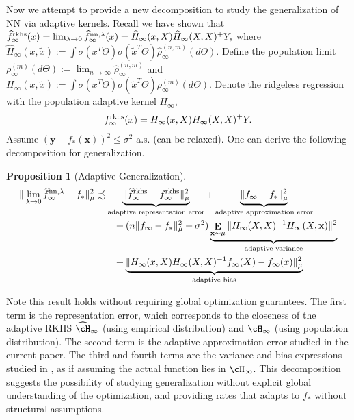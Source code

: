 \documentclass[11pt]{article}
\numberwithin{equation}{section}
\newtheorem{proposition}{Proposition}[section]
\def\E{\mathop{\mathbf{E}}}
\def\bd#1{\mathbf{#1}}
\def\bx{\bd{x}}
\def\by{\bd{y}}
\begin{document}
Now we attempt to provide a new decomposition to study the generalization of NN via adaptive kernels. Recall we have shown that
$\widehat{f}^{\rm rkhs}_{\infty}(x) = \lim_{\lambda \rightarrow 0} \widehat{f}^{{\rm nn}, \lambda}_{\infty} (x) = \widehat{H}_{\infty}(x, X) \widehat{H}_{\infty}(X, X)^{+} Y,$
where
$\widehat{H}_{\infty}(x, \tilde{x}) :=   \int \sigma(x^T \Theta) \sigma(\tilde{x}^T \Theta) \widehat{\rho}^{(n, m)}_\infty(d\Theta).$
Define the population limit
$\rho^{(m)}_{\infty}(d\Theta) := \lim_{n\rightarrow \infty } \widehat{\rho}^{(n, m)}_\infty $ and  $H_{\infty}(x, \tilde{x}) := \int \sigma(x^T \Theta) \sigma(\tilde{x}^T \Theta) \rho^{(m)}_\infty (d\Theta)$. Denote the ridgeless regression with the population adaptive kernel $H_\infty$,
\begin{align*}
    f^{\rm rkhs}_{\infty}(x) = H_{\infty}(x, X) H_{\infty}(X, X)^{+} Y.
\end{align*}
Assume $(\by - f_*(\bx))^2 \leq \sigma^2$ a.s. (can be relaxed). One can derive the following decomposition for generalization.
\begin{proposition}[Adaptive Generalization]
    \label{prop:adaptive-generalization}
    \begin{align*}
        \| \lim_{\lambda \rightarrow 0} \widehat{f}^{{\rm nn}, \lambda}_{\infty}- f_*\|^2_{\mu} & \precsim \underbrace{\| \widehat{f}^{\rm rkhs}_{\infty} - f^{\rm rkhs}_{\infty}  \|_\mu^2}_{\text{adaptive representation error}}  + \underbrace{\| f_\infty - f_* \|_{\mu}^2 }_{\text{adaptive approximation error}} \\
        & \quad \quad + (n \| f_\infty - f_* \|_{\hat{\mu}}^2 +\sigma^2) \underbrace{\E_{\bx \sim \mu} \| H_\infty(X, X)^{-1} H_\infty(X, \bx)\|^2}_{\text{adaptive variance}} \\
        & \quad \quad + \underbrace{\| H_{\infty}(x, X) H_\infty(X, X)^{-1} f_\infty(X) -  f_\infty(x) \|_\mu^2}_{\text{adaptive bias}}
    \end{align*}
\end{proposition}

Note this result holds without requiring global optimization guarantees. The first term is the representation error, which corresponds to the closeness of the adaptive RKHS $\widehat{\cH}_\infty$ (using empirical distribution) and $\cH_\infty$ (using population distribution). The second term is the adaptive approximation error studied in the current paper. The third and fourth terms are the variance and bias expressions studied in \cite{liang2018just, hastie2019surprises, rakhlin2018consistency}, as if assuming the actual function lies in $\cH_\infty$. This decomposition suggests the possibility of studying generalization without explicit global understanding of the optimization, and providing rates that adapts to $f_*$ without structural assumptions.
\end{document}
